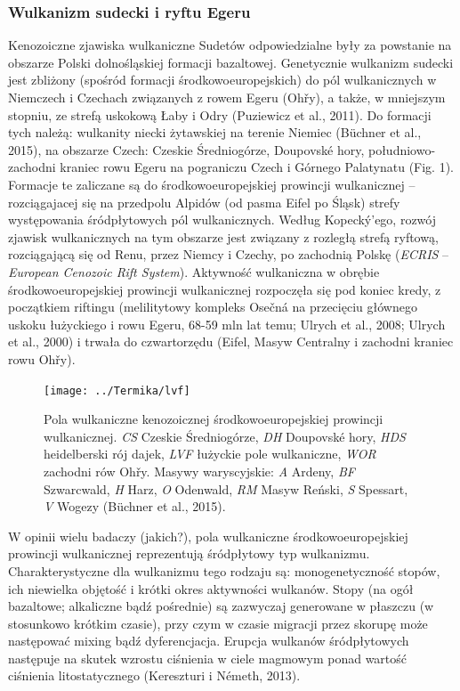 \documentclass[11.5pt,twoside]{report}
\begin{document}
	\subsubsection{Wulkanizm sudecki i ryftu Egeru}

Kenozoiczne zjawiska wulkaniczne Sudetów odpowiedzialne były za powstanie na obszarze Polski dolnośląskiej formacji bazaltowej. Genetycznie wulkanizm sudecki jest zbliżony (spośród formacji środkowoeuropejskich) do pól wulkanicznych w Niemczech i Czechach związanych z rowem Egeru (Oh\v{r}y), a także, w mniejszym stopniu, ze strefą uskokową Łaby i Odry (Puziewicz et al., 2011). Do formacji tych należą: wulkanity niecki żytawskiej na terenie Niemiec (B\"{u}chner et al., 2015), na obszarze Czech: Czeskie Średniogórze, Doupovské hory, południowo-zachodni kraniec rowu Egeru na pograniczu Czech i Górnego Palatynatu (Fig. 1). Formacje te zaliczane są do środkowoeuropejskiej prowincji wulkanicznej -- rozciągajacej się na przedpolu Alpidów (od pasma Eifel po Śląsk) strefy występowania śródpłytowych pól wulkanicznych. Według Kopeck\'{y}'ego, rozwój zjawisk wulkanicznych na tym obszarze jest związany z rozległą strefą ryftową, rozciągającą się od Renu, przez Niemcy i Czechy, po zachodnią Polskę (\textit{ECRIS} -- \textit{European Cenozoic Rift System}). Aktywność wulkaniczna w obrębie środkowoeuropejskiej prowincji wulkanicznej rozpoczęła się pod koniec kredy, z początkiem riftingu (melilitytowy kompleks Osečná na przecięciu głównego uskoku łużyckiego i rowu Egeru, 68-59 mln lat temu; Ulrych et al., 2008; Ulrych et al., 2000) i trwała do czwartorzędu (Eifel, Masyw Centralny i zachodni kraniec rowu Oh\v{r}y).

\begin{figure}[h]
	\centering
	\texttt{[image: ../Termika/lvf]}
	\caption{Pola wulkaniczne kenozoicznej środkowoeuropejskiej prowincji wulkanicznej. \textit{CS} Czeskie Średniogórze, \textit{DH} Doupovsk\'{e} hory, \textit{HDS} heidelberski rój dajek, \textit{LVF} łużyckie pole wulkaniczne, \textit{WOR} zachodni rów Oh\v{r}y. Masywy waryscyjskie: \textit{A} Ardeny, \textit{BF} Szwarcwald, \textit{H} Harz, \textit{O} Odenwald, \textit{RM} Masyw Reński, \textit{S} Spessart, \textit{V} Wogezy (B\"{u}chner et al., 2015).} 
	\label{Fig.}
\end{figure}

W opinii wielu badaczy (jakich?), pola wulkaniczne środkowoeuropejskiej prowincji wulkanicznej reprezentują śródpłytowy typ wulkanizmu. Charakterystyczne dla wulkanizmu tego rodzaju są: monogenetyczność stopów, ich niewielka objętość i krótki okres aktywności wulkanów. Stopy (na ogół bazaltowe; alkaliczne bąd\'{z} pośrednie) są zazwyczaj generowane w płaszczu (w stosunkowo krótkim czasie), przy czym w czasie migracji przez skorupę może następować mixing bąd\'{z} dyferencjacja. Erupcja wulkanów śródpłytowych następuje na skutek wzrostu ciśnienia w ciele magmowym ponad wartość ciśnienia litostatycznego (Kereszturi i Németh, 2013). 
\end{document}
